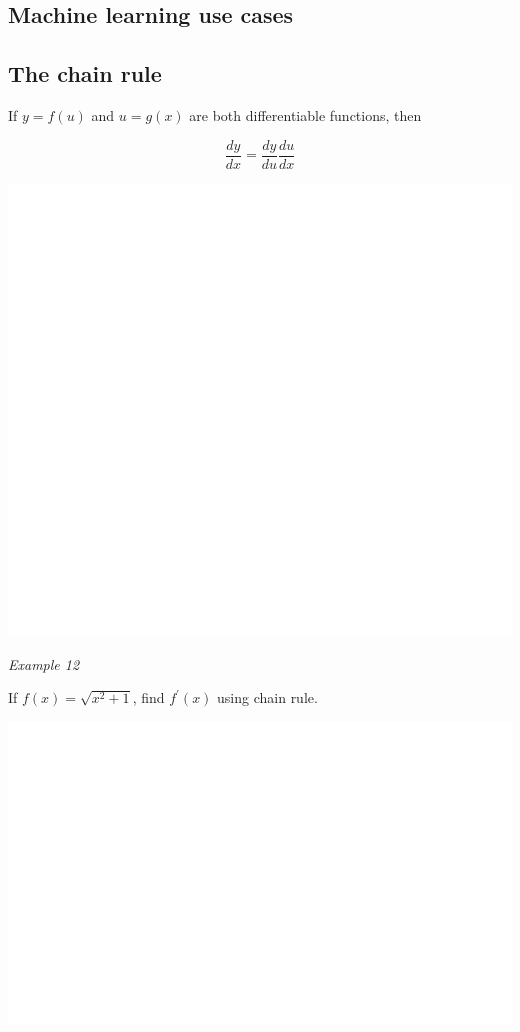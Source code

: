 \documentclass[]{book}
\begin{document}
\hypertarget{machine-learning-use-cases}{%
\subsection{Machine learning use cases}\label{machine-learning-use-cases}}

\hypertarget{the-chain-rule}{%
\subsection{The chain rule}\label{the-chain-rule}}

If \(y=f(u)\) and \(u=g(x)\) are both differentiable functions, then

\[\frac{dy}{dx} = \frac{dy}{du}\frac{du}{dx} \]

\begin{center}\includegraphics[width=1\linewidth]{figure/LB21-1} \end{center}

\emph{Example 12}

If \(f(x)=\sqrt{x^2+1}\), find \(f^\prime(x)\) using chain rule.

\begin{center}\includegraphics[width=1\linewidth]{figure/LB22-1} \end{center}
\end{document}
